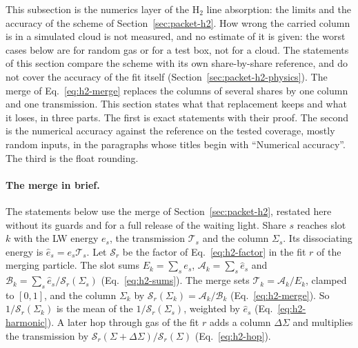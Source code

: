 This subsection is the numerics layer of the H$_2$ line absorption: the limits
and the accuracy of the scheme of Section~\ref{sec:packet-h2}. How wrong the
carried column is in a simulated cloud is not measured, and no estimate of it
is given: the worst cases below are for random gas or for a test box, not for
a cloud. The
statements of this section compare the scheme with its own share-by-share
reference, and do not cover the accuracy of the fit itself
(Section~\ref{sec:packet-h2-physics}). The merge of Eq.~\eqref{eq:h2-merge}
replaces the columns of several shares by one column and one transmission.
This section states what that replacement keeps and what it loses, in three
parts. The first is exact statements with their proof. The second is the
numerical accuracy against the reference on the tested coverage, mostly
random inputs, in the paragraphs whose titles begin with ``Numerical accuracy''. The
third is the float rounding.

\paragraph{The merge in brief.} The statements below use the merge of
Section~\ref{sec:packet-h2}, restated here without its guards and for a full release of the waiting light. Share $s$
reaches slot $k$ with the LW energy $e_s$, the transmission $\mathcal T_s$ and
the column $\Sigma_s$. Its dissociating energy is $\hat e_s=e_s\mathcal T_s$.
Let $\mathcal S_r$ be the factor of Eq.~\eqref{eq:h2-factor} in the fit $r$ of
the merging particle. The slot sums $E_k=\sum_se_s$,
$\mathcal A_k=\sum_s\hat e_s$ and
$\mathcal B_k=\sum_s\hat e_s/\mathcal S_r(\Sigma_s)$
(Eq.~\eqref{eq:h2-sums}). The merge sets $\mathcal T_k=\mathcal A_k/E_k$,
clamped to $[0,1]$, and the column $\Sigma_k$ by
$\mathcal S_r(\Sigma_k)=\mathcal A_k/\mathcal B_k$ (Eq.~\eqref{eq:h2-merge}).
So $1/\mathcal S_r(\Sigma_k)$ is the mean of the $1/\mathcal S_r(\Sigma_s)$,
weighted by $\hat e_s$ (Eq.~\eqref{eq:h2-harmonic}). A later hop through gas
of the fit $r$ adds a column $\Delta\Sigma$ and multiplies the transmission by
$\mathcal S_r(\Sigma+\Delta\Sigma)/\mathcal S_r(\Sigma)$
(Eq.~\eqref{eq:h2-hop}).

